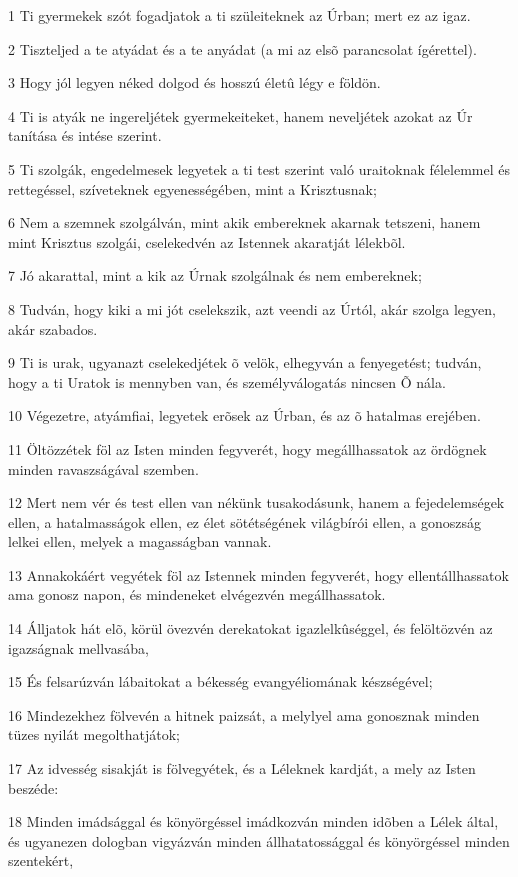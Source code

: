 \par 1 Ti gyermekek szót fogadjatok a ti szüleiteknek az Úrban; mert ez az igaz.
\par 2 Tiszteljed a te atyádat és a te anyádat (a mi az elsõ parancsolat ígérettel).
\par 3 Hogy jól legyen néked dolgod és hosszú életû légy e földön.
\par 4 Ti is atyák ne ingereljétek gyermekeiteket, hanem neveljétek azokat az Úr tanítása és intése szerint.
\par 5 Ti szolgák, engedelmesek legyetek a ti test szerint való uraitoknak félelemmel és rettegéssel, szíveteknek egyenességében, mint a Krisztusnak;
\par 6 Nem a szemnek szolgálván, mint akik embereknek akarnak tetszeni, hanem mint Krisztus szolgái, cselekedvén az Istennek akaratját lélekbõl.
\par 7 Jó akarattal, mint a kik az Úrnak szolgálnak és nem embereknek;
\par 8 Tudván, hogy kiki a mi jót cselekszik, azt veendi az Úrtól, akár szolga legyen, akár szabados.
\par 9 Ti is urak, ugyanazt cselekedjétek õ velök, elhegyván a fenyegetést; tudván, hogy a ti Uratok is mennyben van, és személyválogatás nincsen Õ nála.
\par 10 Végezetre, atyámfiai, legyetek erõsek az Úrban, és az õ hatalmas erejében.
\par 11 Öltözzétek föl az Isten minden fegyverét, hogy megállhassatok az ördögnek minden ravaszságával szemben.
\par 12 Mert nem vér és test ellen van nékünk tusakodásunk, hanem a fejedelemségek ellen, a hatalmasságok ellen, ez élet sötétségének világbírói ellen, a gonoszság lelkei ellen, melyek a magasságban vannak.
\par 13 Annakokáért vegyétek föl az Istennek minden fegyverét, hogy ellentállhassatok ama gonosz napon, és mindeneket elvégezvén megállhassatok.
\par 14 Álljatok hát elõ, körül övezvén derekatokat igazlelkûséggel, és felöltözvén az igazságnak mellvasába,
\par 15 És felsarúzván lábaitokat a békesség evangyéliomának készségével;
\par 16 Mindezekhez fölvevén a hitnek paizsát, a melylyel ama gonosznak minden tüzes nyilát megolthatjátok;
\par 17 Az idvesség sisakját is fölvegyétek, és a Léleknek kardját, a mely az Isten beszéde:
\par 18 Minden imádsággal és könyörgéssel imádkozván minden idõben a Lélek által, és ugyanezen dologban vigyázván minden állhatatossággal és könyörgéssel minden szentekért,
